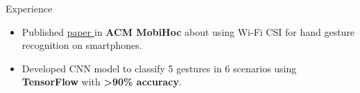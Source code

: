 \documentclass{resume} %
\begin{document}
\begin{workSection}{Experience}
    \experienceItem[
    company=Temple University,
    location=Philadelphia{,} PA,
    position=Research Intern,
    duration=June 2023 {-} July 2023
    ]
    \begin{itemize}
        \vspace{-0.5em}
        \itemsep -6pt {}
				\item Published
				\href{https://dl.acm.org/doi/10.1145/3565287.3617613}{{paper} } 
				in \textbf{ACM MobiHoc} about using Wi-Fi CSI for hand gesture recognition on smartphones.
        \item Developed CNN model to classify 5 gestures 
				in 6 scenarios using \textbf{TensorFlow} with \textbf{>90\% accuracy}. %
    \end{itemize}

\end{workSection}
\end{document}
